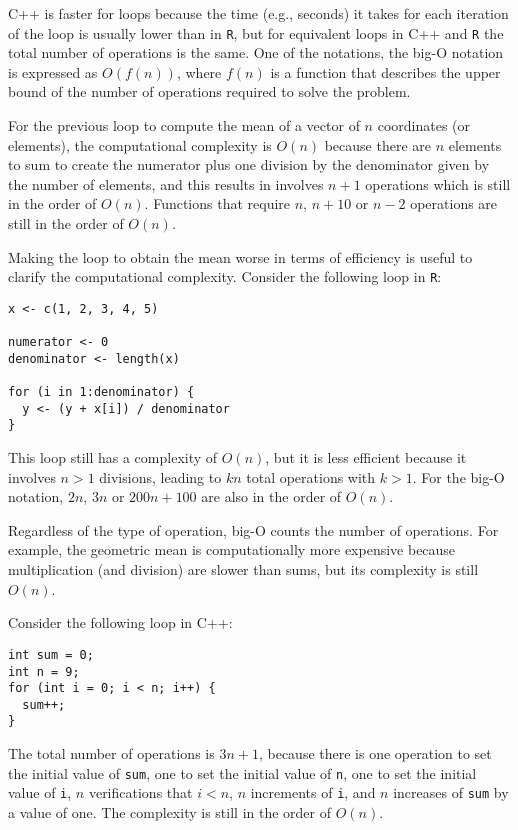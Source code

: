 C++ is faster for loops because the time (e.g., seconds) it takes for each
iteration of the loop is usually lower than in \texttt{R}, but for equivalent loops in
C++ and \texttt{R} the total number of operations is the same. One of the notations,
the big-O notation is expressed as \(O(f(n))\), where \(f(n)\) is a function that
describes the upper bound of the number of operations required to solve the
problem.

For the previous loop to compute the mean of a vector of \(n\) coordinates (or
elements), the computational complexity is \(O(n)\) because there are \(n\) elements
to sum to create the numerator plus one division by the denominator given by the
number of elements, and this results in involves \(n+1\) operations which is still
in the order of \(O(n)\). Functions that require \(n\), \(n+10\) or \(n-2\) operations
are still in the order of \(O(n)\).

Making the loop to obtain the mean worse in terms of efficiency is useful to
clarify the computational complexity. Consider the following loop in \texttt{R}:

\begin{verbatim}
x <- c(1, 2, 3, 4, 5)

numerator <- 0
denominator <- length(x)

for (i in 1:denominator) {
  y <- (y + x[i]) / denominator
}
\end{verbatim}

This loop still has a complexity of \(O(n)\), but it is less efficient because it
involves \(n>1\) divisions, leading to \(kn\) total operations with \(k>1\). For the
big-O notation, \(2n\), \(3n\) or \(200n + 100\) are also in the order of \(O(n)\).

Regardless of the type of operation, big-O counts the number of operations. For
example, the geometric mean is computationally more expensive because
multiplication (and division) are slower than sums, but its complexity is still
\(O(n)\).

Consider the following loop in C++:

\begin{verbatim}
int sum = 0;
int n = 9;
for (int i = 0; i < n; i++) {
  sum++;
}
\end{verbatim}

The total number of operations is \(3n+1\), because there is one operation to set
the initial value of \texttt{sum}, one to set the initial value of \texttt{n}, one to set the
initial value of \texttt{i}, \(n\) verifications that \(i<n\), \(n\) increments of \texttt{i}, and
\(n\) increases of \texttt{sum} by a value of one. The complexity is still in the order
of \(O(n)\).

